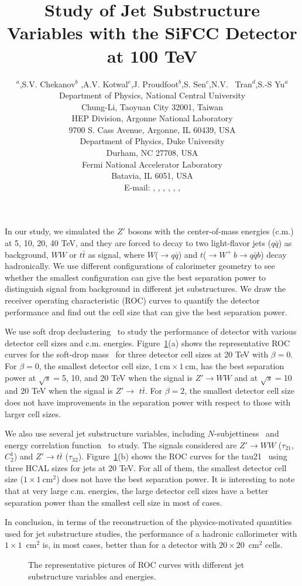 \documentclass[a4paper]{PoS}
\title{Study of Jet Substructure Variables with the SiFCC Detector at 100 TeV}
\author{\speaker{C.-H Yeh}$^a$,S.V. Chekanov$^b$ ,A.V. Kotwal$^{c}$,J. Proudfoot$^{b}$,S. Sen$^{c}$,N.V. ~Tran$^{d}$,S.-S Yu$^{a}$\\     
     \llap{$^a$}Department of Physics, National Central University\\
     Chung-Li, Taoyuan City 32001, Taiwan\\
     \llap{$^b$}HEP Division, Argonne National Laboratory\\
     9700 S. Cass Avenue, Argonne, IL 60439, USA\\
     \llap{$^c$}Department of Physics, Duke University\\
     Durham, NC 27708, USA\\
     \llap{$^d$}Fermi National Accelerator Laboratory\\
     Batavia, IL 6051, USA\\
     E-mail:  \email{a9510130375@gmail.com},
     \email{chekanov@anl.gov},
     \email{kotwal@phy.duke.edu},
     \email{proudfoot@anl.gov},
     \email{sourav.sen@duke.edu},
     \email{ntran@fnal.gov},
     \email{syu@phy.ncu.edu.tw}}
\begin{document}
In our study, we simulated the $Z'$ bosons with the center-of-mass energies (c.m.) at 5, 10, 20, 40 TeV, and they are forced to decay to two light-flavor jets ($q\bar{q}$) as background, $W W$ or $t\bar{t}$ as signal, where $W$($\rightarrow$$q\bar{q}$) and $t$($ \rightarrow  W^+\>b \rightarrow q\bar{q} b$) decay hadronically. We use different configurations of calorimeter geometry to see whether the smallest configuration can give the best separation power to distinguish signal from background in different jet substructures. We draw the receiver operating characteristic (ROC) curves to quantify the detector performance and find out the cell size that can give the best separation power.

We use soft drop declustering~\cite{Larkoski:2014wba} to study the performance of detector with various detector cell sizes and c.m. energies. Figure~\ref{1}(a) shows the representative ROC curves for the soft-drop mass~\cite{Larkoski:2014wba} for three detector cell sizes at 20 TeV with $\beta=0$. For $\beta=0$, the smallest detector cell size, $1~\mathrm{cm}\times1~\mathrm{cm}$, has the best separation power at $\sqrt{s}=$5, 10, and 20 TeV when the signal is $Z' \rightarrow WW$ and at $\sqrt{s}=$10 and 20 TeV when the signal is $Z' \rightarrow$ $t\bar{t}$. For $\beta=2$, the smallest detector cell size does not have improvements in the separation power with respect to those with larger cell sizes.

We also use several jet substructure variables, including $N$-subjettiness~\cite{Thaler:2010tr} and energy correlation function~\cite{Larkoski:2013eya} to study. The signals considered are $Z'\rightarrow WW$ ($\tau_{21}$,$C_2^1$) and $Z' \rightarrow t\bar{t}$ ($\tau_{32}$). Figure~\ref{1}(b) shows the ROC curves for the tau21~\cite{Thaler:2010tr} using three HCAL sizes for jets at 20 TeV. For all of them, the smallest detector cell size ($1\times1~\mathrm{cm}^2$) does not have the best separation power. It is interesting to note that at very large c.m. energies, the large detector cell sizes have a better separation power than the smallest cell size in most of cases. 


In conclusion, in terms of the reconstruction of the physics-motivated quantities  
used for jet substructure studies, the  performance 
of a  hadronic callorimeter  with 
$1\times 1$~cm$^2$ is, in most cases,
better than for a detector with  $20\times 20$~cm$^2$ cells.


\begin{figure}
\begin{center}
\end{center}
\caption{The representative pictures of ROC curves with different jet substructure variables and energies.}
\label{1}
\end{figure}
\end{document}
